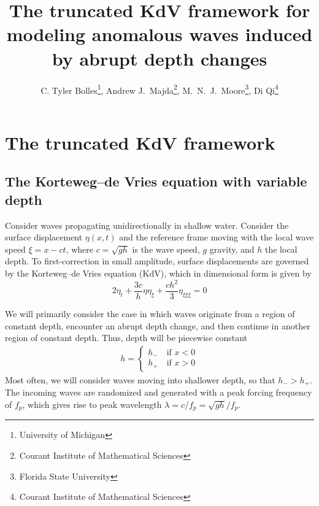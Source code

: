 \documentclass[11pt]{article}
\newcommand{\depth}{h}
\newcommand{\dup}{\depth_{-}}
\newcommand{\ddn}{\depth_{+}}
\newcommand{\freqp}{f_p}
\newcommand{\lam}{\lambda}
\begin{document}
\title{The truncated KdV framework for modeling anomalous waves induced by abrupt depth changes}

\author{
C. Tyler Bolles\thanks{University of Michigan},
Andrew J.~Majda\thanks{Courant Institute of Mathematical Sciences}, 
M.~N.~J.~Moore\thanks{Florida State University}, 
Di Qi\thanks{Courant Institute of Mathematical Sciences} }
\maketitle



\section{The truncated KdV framework}


\subsection{The Korteweg–de Vries equation with variable depth}
Consider waves propagating unidirectionally in shallow water. Consider the surface displacement $\eta(x,t)$ and the reference frame moving with the local wave speed $\xi = x - ct$, where $c = \sqrt{g \depth}$ is the wave speed, $g$ gravity, and $\depth$ the local depth.
To first-correction in small amplitude, surface displacements are governed by the Korteweg–de Vries equation (KdV), which in dimensional form is given by
\begin{equation}
2 \eta_t + \frac{3 c}{\depth} \eta \eta_{\xi} + \frac{c \depth^2}{3} \eta_{\xi \xi \xi} = 0
\end{equation}

We will primarily consider the case in which waves originate from a region of constant depth, encounter an abrupt depth change, and then continue in another region of constant depth. Thus, depth will be piecewise constant
\begin{align}
\depth = 
\begin{cases}
\dup \quad \mbox{if } x<0 \\
\ddn \quad \mbox{if } x>0
\end{cases}
\end{align}
Most often, we will consider waves moving into shallower depth, so that $\dup > \ddn$. The incoming waves are randomized and generated with a peak forcing frequency of $\freqp$, which gives rise to peak wavelength $\lam = c/\freqp = \sqrt{g \depth} / \freqp$.
\end{document}
